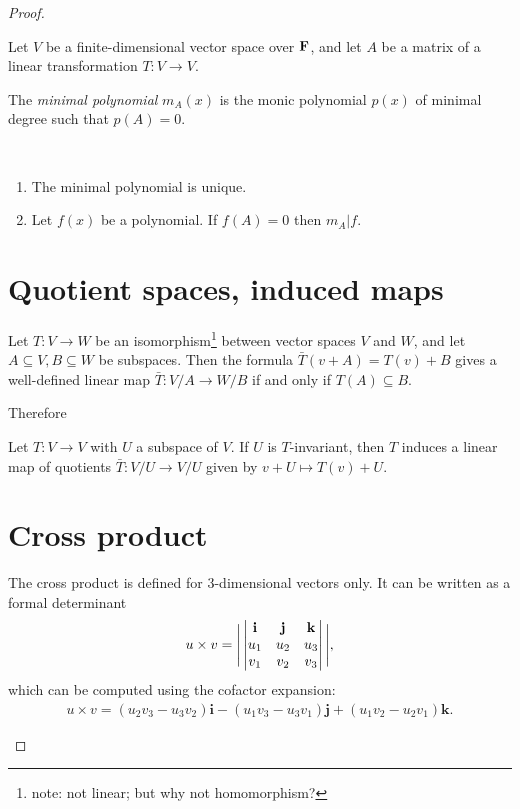 \begin{proof}
\begin{definition*}
  Let $V$ be a finite-dimensional vector space over $\mathbf{F}$, and let $A$ be a matrix of a linear
  transformation $T:V \to V$.

  The \emph{minimal polynomial} $m_A(x)$ is the monic polynomial $p(x)$ of minimal degree such that
  $p(A) = 0$.
\end{definition*}

\begin{theorem*}
  ~\\
  \begin{enumerate}
  \item The minimal polynomial is unique.
  \item Let $f(x)$ be a polynomial. If $f(A) = 0$ then $m_A | f$.
  \end{enumerate}
\end{theorem*}


\section{Quotient spaces, induced maps}

\begin{theorem*}
  Let $T:V \to W$ be an isomorphism\footnote{note: not linear; but why not homomorphism?} between
  vector spaces $V$ and $W$, and let $A \subseteq V, B \subseteq W$ be subspaces. Then the formula
  $\bar T(v + A) = T(v) + B$ gives a well-defined linear map $\bar T:V/A \to W/B$ if and only if
  $T(A) \subseteq B$.
\end{theorem*}

Therefore

\begin{theorem*}
  Let $T:V \to V$ with $U$ a subspace of $V$. If $U$ is $T$-invariant, then $T$ induces a linear
  map of quotients $\bar T:V/U \to V/U$ given by $v + U \mapsto T(v) + U$.
\end{theorem*}
\section{Cross product}
\begin{definition*}
  The cross product is defined for 3-dimensional vectors only. It can be written as a formal
  determinant
  \begin{align*}
    u \times v = \Bigg|
    \begin{vmatrix}\mathbf{i} & \mathbf{j} & \mathbf{k}\\u_1 & u_2 & u_3\\v_1 & v_2 & v_3\\ \end{vmatrix}
    \Bigg|,
  \end{align*}
  which can be computed using the cofactor expansion:
  \begin{align*}
    u \times v =
      (u_2v_3 - u_3v_2)\mathbf{i}
    - (u_1v_3 - u_3v_1)\mathbf{j}
    + (u_1v_2 - u_2v_1)\mathbf{k}.
  \end{align*}
\end{definition*}



\end{proof}
